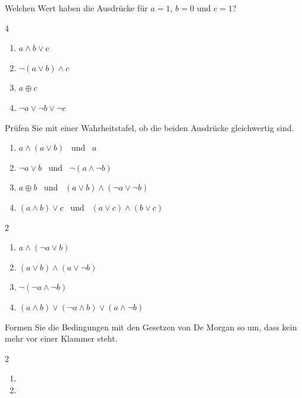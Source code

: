 Welchen Wert haben die Ausdrücke für $a = 1$, $b = 0$ und $c = 1$?
\begin{multicols}{4}
\begin{enumerate}[label=\alph*)]
\item $a \wedge b \vee c$
\item $\neg(a \vee b) \wedge c$
\item $a \oplus c$
\item $\neg a \vee \neg b \vee \neg c$
\end{enumerate}
\end{multicols}

Prüfen Sie mit einer Wahrheitstafel, ob die beiden Ausdrücke gleichwertig sind.
\begin{enumerate}[label=\alph*)]
\item $a \wedge (a \vee b)$ \ und \ $a$
\item $\neg a \vee b$ \ und \ $\neg(a \wedge \neg b)$
\item $a \oplus b$ \ und \ $(a \vee b) \wedge (\neg a \vee \neg b)$
\item $(a \wedge b) \vee c$ \ und \ $(a \vee c) \wedge (b \vee c)$
\end{enumerate}

\begin{multicols}{2}
\begin{enumerate}[label=\alph*)]
\item $a \wedge (\neg a \vee b)$
\item $(a \vee b) \wedge (a \vee \neg b)$
\item $\neg(\neg a \wedge \neg b)$
\item $(a \wedge b) \vee (\neg a \wedge b) \vee (a \wedge \neg b)$
\end{enumerate}
\end{multicols}

Formen Sie die Bedingungen mit den Gesetzen von De Morgan so um, dass kein \code{!} mehr vor einer Klammer steht.
\begin{multicols}{2}
\begin{enumerate}[label=\alph*)]
\item {}
\item {}
\end{enumerate}
\end{multicols}
